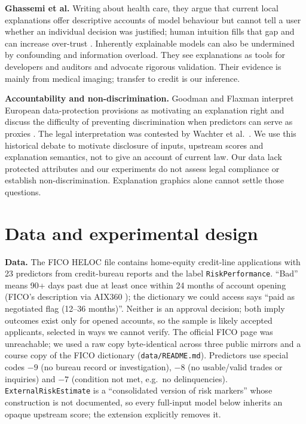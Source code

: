 \documentclass[11pt,a4paper]{article}
\newcommand{\var}[1]{{\small\nolinkurl{#1}}}
\begin{document}
\textbf{Ghassemi et al.} Writing about health care, they argue that current local explanations offer descriptive accounts of model behaviour but cannot tell a user whether an individual decision was justified; human intuition fills that gap and can increase over-trust \cite{ghassemi2021false}. Inherently explainable models can also be undermined by confounding and information overload. They see explanations as tools for developers and auditors and advocate rigorous validation. Their evidence is mainly from medical imaging; transfer to credit is our inference.

\textbf{Accountability and non-discrimination.} Goodman and Flaxman interpret European data-protection provisions as motivating an explanation right and discuss the difficulty of preventing discrimination when predictors can serve as proxies \cite{goodman2017eu}. The legal interpretation was contested by Wachter et al.\ \cite{wachter2017right}. We use this historical debate to motivate disclosure of inputs, upstream scores and explanation semantics, not to give an account of current law. Our data lack protected attributes and our experiments do not assess legal compliance or establish non-discrimination. Explanation graphics alone cannot settle those questions.

\section{Data and experimental design}\label{sec:data}
\textbf{Data.} The FICO HELOC file contains \NRaw{} home-equity credit-line applications with 23 predictors from credit-bureau reports and the label \var{RiskPerformance}. ``Bad'' means 90+ days past due at least once within 24 months of account opening (FICO's description via AIX360 \cite{aix360heloc}); the dictionary we could access says ``paid as negotiated flag (12--36 months)''. Neither is an approval decision; both imply outcomes exist only for opened accounts, so the sample is likely accepted applicants, selected in ways we cannot verify. The official FICO page was unreachable; we used a raw copy byte-identical across three public mirrors and a course copy of the FICO dictionary (\texttt{data/README.md}). Predictors use special codes $-9$ (no bureau record or investigation), $-8$ (no usable/valid trades or inquiries) and $-7$ (condition not met, e.g.\ no delinquencies). \var{ExternalRiskEstimate} is a ``consolidated version of risk markers'' whose construction is not documented, so every full-input model below inherits an opaque upstream score; the extension explicitly removes it.
\end{document}
